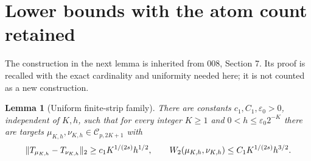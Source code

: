 \documentclass[11pt]{article}
\newtheorem{lemma}[theorem]{Lemma}
\theoremstyle{remark}\newtheorem{remark}[theorem]{Remark}
\begin{document}
\section{Lower bounds with the atom count retained}
The construction in the next lemma is inherited from 008, Section 7. Its proof is recalled with the exact cardinality and uniformity needed here; it is not counted as a new construction.

\begin{lemma}[Uniform finite-strip family]\label{lem:strips}
There are constants $c_1,C_1,\varepsilon_0>0$, independent of $K,h$, such that for every integer $K\ge1$ and $0<h\le\varepsilon_0 2^{-K}$ there are targets $\mu_{K,h},\nu_{K,h}\in\mathcal C_{p,2K+1}$ with
\begin{equation}\label{eq:strips}
 \lVert T_{\mu_{K,h}}-T_{\nu_{K,h}}\rVert_2\ge c_1K^{1/(2s)}h^{1/2},\qquad
 W_2(\mu_{K,h},\nu_{K,h})\le C_1K^{1/(2s)}h^{3/2}.
\end{equation}
\end{lemma}
\end{document}
